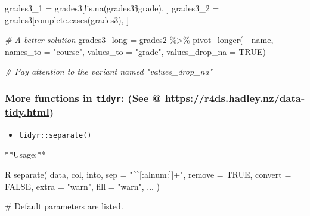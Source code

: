 \documentclass[
]{article}
\newenvironment{Shaded}{}{}
\newcommand{\AttributeTok}[1]{\textcolor[rgb]{0.49,0.56,0.16}{#1}}
\newcommand{\CommentTok}[1]{\textcolor[rgb]{0.38,0.63,0.69}{\textit{#1}}}
\newcommand{\ConstantTok}[1]{\textcolor[rgb]{0.53,0.00,0.00}{#1}}
\newcommand{\FunctionTok}[1]{\textcolor[rgb]{0.02,0.16,0.49}{#1}}
\newcommand{\NormalTok}[1]{#1}
\newcommand{\OtherTok}[1]{\textcolor[rgb]{0.00,0.44,0.13}{#1}}
\newcommand{\SpecialCharTok}[1]{\textcolor[rgb]{0.25,0.44,0.63}{#1}}
\newcommand{\StringTok}[1]{\textcolor[rgb]{0.25,0.44,0.63}{#1}}
\begin{document}
\begin{Shaded}
\begin{Highlighting}[]
\NormalTok{grades3\_1 }\OtherTok{=}
\NormalTok{	grades3[}\SpecialCharTok{!}\FunctionTok{is.na}\NormalTok{(grades3}\SpecialCharTok{\$}\NormalTok{grade), ]}
\NormalTok{grades3\_2 }\OtherTok{=}
\NormalTok{	grades3[}\FunctionTok{complete.cases}\NormalTok{(grades3), ]}

\CommentTok{\# A better solution}
\NormalTok{grades3\_long }\OtherTok{=}\NormalTok{ grades2 }\SpecialCharTok{\%\textgreater{}\%} 
  \FunctionTok{pivot\_longer}\NormalTok{( }\SpecialCharTok{{-}}\NormalTok{ name, }
                \AttributeTok{names\_to =} \StringTok{"course"}\NormalTok{, }
                \AttributeTok{values\_to =} \StringTok{"grade"}\NormalTok{,}
                \AttributeTok{values\_drop\_na =} \ConstantTok{TRUE}\NormalTok{)}

\CommentTok{\# Pay attention to the variant named "values\_drop\_na"}
\end{Highlighting}
\end{Shaded}

\hypertarget{more-functions-in-tidyr-see--httpsr4dshadleynzdata-tidyhtml}{%
\subsubsection{\texorpdfstring{More functions in \texttt{tidyr}: (See @
\url{https://r4ds.hadley.nz/data-tidy.html})}{More functions in tidyr: (See @ https://r4ds.hadley.nz/data-tidy.html)}}\label{more-functions-in-tidyr-see--httpsr4dshadleynzdata-tidyhtml}}

\begin{itemize}
\item
  \texttt{tidyr::separate()}
\end{itemize}

\begin{Shaded}
\begin{Highlighting}[]
\NormalTok{**Usage:**}

\NormalTok{\textasciigrave{}\textasciigrave{}\textasciigrave{}R}
\NormalTok{separate(}
\NormalTok{  data,}
\NormalTok{  col,}
\NormalTok{  into,}
\NormalTok{  sep = "[\^{}[:alnum:]]+",}
\NormalTok{  remove = TRUE,}
\NormalTok{  convert = FALSE,}
\NormalTok{  extra = "warn",}
\NormalTok{  fill = "warn",}
\NormalTok{  ...}
\NormalTok{)}

\NormalTok{\# Default parameters are listed.}
\NormalTok{\textasciigrave{}\textasciigrave{}\textasciigrave{}}
\end{Highlighting}
\end{Shaded}
\end{document}
